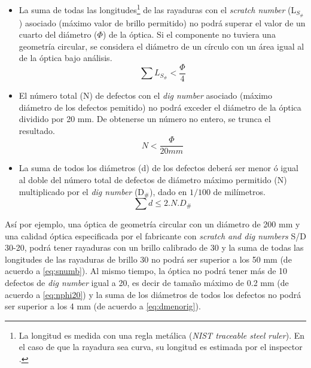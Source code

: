 \begin{itemize}
\item La suma de todas las longitudes\footnote{La longitud es medida con una regla metálica (\textit{NIST traceable steel ruler}). En el caso de que la rayadura sea curva, su longitud es estimada por el inspector \cite{Aikens}.} de las rayaduras con el \textit{scratch number} (L$_{S_{\#}}$) asociado (máximo valor de brillo permitido) no podrá superar el valor de un cuarto del diámetro ($\Phi$) de la óptica. Si el componente no tuviera una geometría circular, se considera el diámetro de un círculo con un área igual al de la óptica bajo análisis.
\begin{equation}
\sum L_{S_{\#}} < \frac{\Phi}{4}
\label{eq:snumb}
\end{equation}
\item El número total (N) de defectos con el \textit{dig number} asociado (máximo diámetro de los defectos pemitido) no podrá exceder el diámetro de la óptica dividido por 20 mm. De obtenerse un número no entero, se trunca el resultado.
\begin{equation}
N  <  \frac{\Phi}{20 mm}
\label{eq:nphi20}
\end{equation}
\item La suma de todos los diámetros (d) de los defectos deberá ser menor ó igual al doble del número total de defectos de diámetro máximo permitido (N) multiplicado por el \textit{dig number} (D$_{\#}$), dado en $1/100$ de milímetros.
\begin{equation}
\sum d 	\leq 2 . N . D_{\#}
\label{eq:dmenorig}
\end{equation}
\end{itemize}
\hspace{0.5cm}Así por ejemplo, una óptica de geometría circular con un diámetro de 200 mm y una calidad óptica especificada por el fabricante con \textit{scratch and dig numbers} S/D 30-20, podrá tener rayaduras con un brillo calibrado de 30 y la suma de todas las longitudes de las rayaduras de brillo 30 no podrá ser superior a los 50 mm (de acuerdo a \eqref{eq:snumb}). Al mismo tiempo, la óptica no podrá tener más de 10 defectos de \textit{dig number} igual a 20, es decir de tamaño máximo de 0.2 mm (de acuerdo a  \eqref{eq:nphi20}) y la suma de los diámetros de todos los defectos no podrá ser superior a los 4 mm (de acuerdo a \eqref{eq:dmenorig}).

